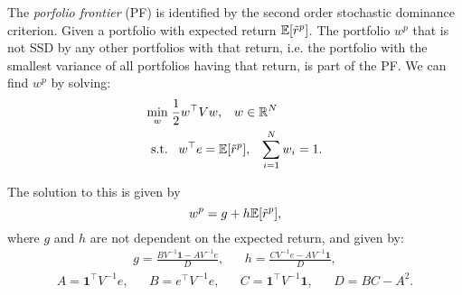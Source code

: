 \documentclass[twoside]{article}
\begin{document}
The \textit{porfolio frontier} (PF) is identified by the second order stochastic dominance criterion. Given a portfolio with expected return $\mathbb{E}[\tilde{r}^p]$. The portfolio $w^p$ that is not SSD by any other portfolios with that return, i.e. the portfolio with the smallest variance of all portfolios having that return, is part of the PF. We can find $w^p$ by solving:
\begin{align*}
    \min_w& \;\frac{1}{2}w^\top V w, \;\;\; w \in \mathbb{R}^N \\
    \text{s.t.}&  \;\;\; w^\top e = \mathbb{E}[\tilde{r}^p], \;\;\; \sum_{i=1}^N w_i = 1.
\end{align*}

The solution to this is given by
\[
    w^p = g + h \mathbb{E}[\tilde{r}^p],
\]
where $g$ and $h$ are not dependent on the expected return, and given by:
\begin{align*}
    g = \frac{BV^{-1}\mathbf{1}-AV^{-1}e}{D}, && h = \frac{CV^{-1}e - AV^{-1}\mathbf{1}}{D},
\end{align*}
\vspace{-15pt}
\begin{align*}
    A = \mathbf{1}^\top V^{-1}e, && B = e^\top V^{-1}e, && C = \mathbf{1}^\top V^{-1} \mathbf{1}, && D = BC - A^2.
\end{align*}
\end{document}
